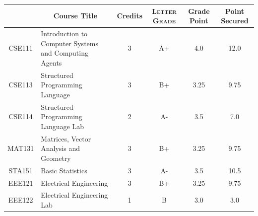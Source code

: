 \documentclass[11pt]{article}
\newcommand*{\numtwo}[1]{\pgfmathprintnumber[
                    fixed, precision=2, fixed zerofill=true]{#1}}
\begin{document}
                \begin{center}
                    \renewcommand{\arraystretch}{1.08}
                    
                \begin{tabular}{|c|l|c|>{\scshape}c|c|c|}
                \hline  \rule[-1ex]{0pt}{3.5ex} {\centering{\bf Course Code}} &  \multicolumn{1}{c|}{\textbf{Course Title}}  & {\bf Credits} & {\bf Letter Grade} & {\bf Grade Point} & {\bf Point Secured}  \\ 
                \hline   CSE111 &  Introduction to Computer Systems and Computing Agents		 & 3 & A+ & 4.0 & 12.0 \\ %
                \hline   CSE113 &  Structured Programming Language		 & 3 & B+ & 3.25 & 9.75 \\ %
                \hline   CSE114 &  Structured Programming Language Lab		 & 2 & A- & 3.5 & 7.0 \\ %
                \hline   MAT131 &  Matrices, Vector Analysis and Geometry		 & 3 & B+ & 3.25 & 9.75 \\ %
                \hline   STA151 &  Basic Statistics		 & 3 & A- & 3.5 & 10.5 \\ %
                \hline   EEE121 &  Electrical Engineering		 & 3 & B+ & 3.25 & 9.75 \\ %
                \hline   EEE122 &  Electrical Engineering Lab		 & 1 & B & 3.0 & 3.0 \\ %

\hline                %
                \end{tabular}
                \end{center}
                \renewcommand{\arraystretch}{1.03}
\end{document}
